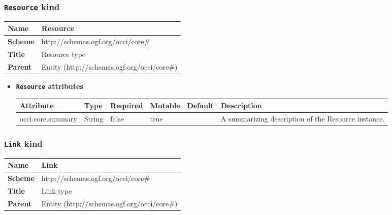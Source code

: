 \subsubsection{\texttt{Resource} kind}
\begin{center}
\begin{tabular}{|l|l|}
  \hline
  \textbf{Name} & Resource \\
  \hline  
  \textbf{Scheme} & http://schemas.ogf.org/occi/core\# \\
  \hline
  \textbf{Title} & Resource type \\
  \hline
  \textbf{Parent} & Entity (http://schemas.ogf.org/occi/core\#) \\
  \hline
\end{tabular}
\end{center}
\begin{itemize}
\item \textbf{\texttt{Resource} attributes}

\begin{tabularx}{\textwidth}{|l|l|p{1.4cm}|p{1.3cm}|l|X|}
  \hline
  \textbf{Attribute} & \textbf{Type} & \textbf{Required} & \textbf{Mutable} & \textbf{Default} & \textbf{Description} \\
  \hline  
  occi.core.summary & String & false & true &  & A summarizing description of the Resource instance. \\
  \hline
\end{tabularx}
\end{itemize}



\subsubsection{\texttt{Link} kind}
\begin{center}
\begin{tabular}{|l|l|}
  \hline
  \textbf{Name} & Link \\
  \hline  
  \textbf{Scheme} & http://schemas.ogf.org/occi/core\# \\
  \hline
  \textbf{Title} & Link type \\
  \hline
  \textbf{Parent} & Entity (http://schemas.ogf.org/occi/core\#) \\
  \hline
\end{tabular}
\end{center}



